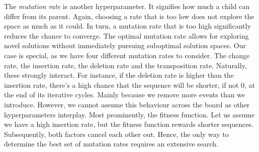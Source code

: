 \documentclass[./../../paper.tex]{subfiles}
\begin{document}
The \emph{mutation rate} is another hyperparameter. It signifies how much a child can differ from its parent. Again, choosing a rate that is too low does not explore the space as much as it could. In turn, a mutation rate that is too high significantly reduces the chance to converge. The optimal mutation rate allows for exploring novel solutions without immediately pursuing suboptimal solution spaces. Our case is special, as we have four different mutation rates to consider. The change rate, the insertion rate, the deletion rate and the transposition rate. Naturally, these strongly interact. For instance, if the deletion rate is higher than the insertion rate, there's a high chance that the sequence will be shorter, if not 0, at the end of its iterative cycles. Mainly because we remove more events than we introduce. However, we cannot assume this behaviour across the board as other hyperparameters interplay. Most prominently, the fitness function. Let us assume we have a high insertion rate, but the fitness function rewards shorter sequences. Subsequently, both factors cancel each other out. Hence, the only way to determine the best set of mutation rates requires an extensive search.

\end{document}
